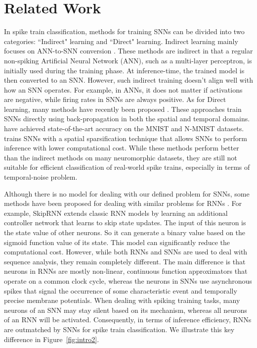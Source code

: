 \section{Related Work}
In spike train classification, methods for training SNNs can be divided into two categories: ``Indirect" learning and ``Direct" learning. 
Indirect learning mainly focuses on ANN-to-SNN conversion \cite{diehl2015fast,cao2015spiking,hu2018spiking, midya2019artificial}.
These methods are indirect in that a regular non-spiking Artificial Neural Network (ANN), such as a multi-layer perceptron, is initially used during the training phase. 
At inference-time, the trained model is then converted to an SNN. However, such indirect training doesn't align well with how an SNN operates. For example, in ANNs, it does not matter if activations are negative, while firing rates in SNNs are always positive. As for Direct learning, many methods have recently been proposed \cite{shrestha2018slayer, wu2019direct, yin2021energy}. These approaches train SNNs directly using back-propagation in both the spatial and temporal domains. \cite{shrestha2018slayer,wu2019direct} have achieved state-of-the-art accuracy on the MNIST and N-MNIST datasets. 
\cite{yin2021energy} trains SNNs with a spatial sparsification technique that allows SNNs to perform inference with lower computational cost. While these methods perform better than the indirect methods on many neuromorphic datasets, they are still not suitable for efficient classification of real-world spike trains, especially in terms of temporal-noise problem. 

Although there is no model for dealing with our defined problem for SNNs, some methods have been proposed for dealing with similar problems for RNNs \cite{lalapura2021recurrent, lei2021attention, morais2021learning, zheng2021accurate, hartvigsen2020learning, jernite2016variable, campos2017skip, shen2018ordered}. 
For example, SkipRNN \cite{campos2017skip} extends classic RNN models by learning an additional controller network that learns to skip state updates. 
The input of this neuron is the state value of other neurons. So it can generate a binary value based on the sigmoid function value of its state. This model can significantly reduce the computational cost. 
However, while both RNNs and SNNs are used to deal with sequence analysis, they remain completely different. 
The main difference is that neurons in RNNs are mostly non-linear, continuous function approximators that operate on a common clock cycle, whereas the neurons in SNNs use asynchronous spikes that signal the occurrence of some characteristic event and temporally precise membrane potentials. When dealing with spiking training tasks, many neurons of an SNN may stay silent based on its mechanism, whereas all neurons of an RNN will be activated. 
Consequently, in terms of inference efficiency, RNNs are outmatched by SNNs for spike train classification. 
We illustrate this key difference in Figure~\ref{fig:intro2}.